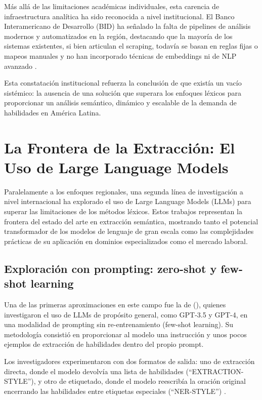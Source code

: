 Más allá de las limitaciones académicas individuales, esta carencia de infraestructura analítica ha sido reconocida a nivel institucional. El Banco Interamericano de Desarrollo (BID) ha señalado la falta de pipelines de análisis modernos y automatizados en la región, destacando que la mayoría de los sistemas existentes, si bien articulan el scraping, todavía se basan en reglas fijas o mapeos manuales y no han incorporado técnicas de embeddings ni de NLP avanzado \cite{echeverria2022}.

Esta constatación institucional refuerza la conclusión de que existía un vacío sistémico: la ausencia de una solución que superara los enfoques léxicos para proporcionar un análisis semántico, dinámico y escalable de la demanda de habilidades en América Latina.

\section{La Frontera de la Extracción: El Uso de Large Language Models}

Paralelamente a los enfoques regionales, una segunda línea de investigación a nivel internacional ha explorado el uso de Large Language Models (LLMs) para superar las limitaciones de los métodos léxicos. Estos trabajos representan la frontera del estado del arte en extracción semántica, mostrando tanto el potencial transformador de los modelos de lenguaje de gran escala como las complejidades prácticas de su aplicación en dominios especializados como el mercado laboral.

\subsection{Exploración con prompting: zero-shot y few-shot learning}

Una de las primeras aproximaciones en este campo fue la de \citeauthor{nguyen2024} (\citeyear{nguyen2024}), quienes investigaron el uso de LLMs de propósito general, como GPT-3.5 y GPT-4, en una modalidad de prompting sin re-entrenamiento (few-shot learning). Su metodología consistió en proporcionar al modelo una instrucción y unos pocos ejemplos de extracción de habilidades dentro del propio prompt.

Los investigadores experimentaron con dos formatos de salida: uno de extracción directa, donde el modelo devolvía una lista de habilidades (``EXTRACTION-STYLE''), y otro de etiquetado, donde el modelo reescribía la oración original encerrando las habilidades entre etiquetas especiales (``NER-STYLE'') \cite{nguyen2024}.

